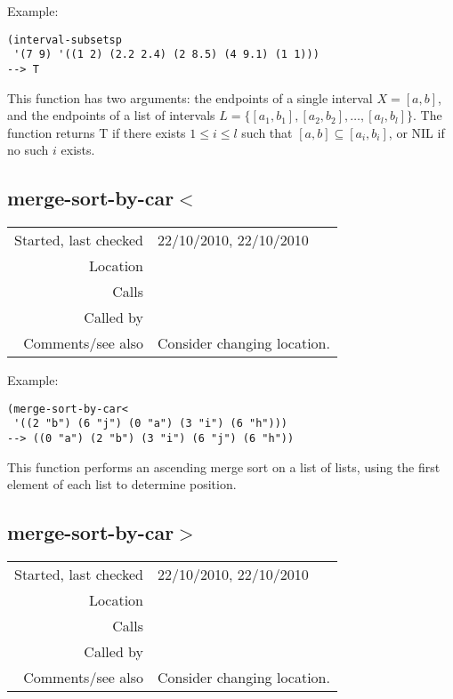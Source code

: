 \vspace{0.5cm}
\noindent Example:
\begin{verbatim}
(interval-subsetsp
 '(7 9) '((1 2) (2.2 2.4) (2 8.5) (4 9.1) (1 1)))
--> T
\end{verbatim}

\noindent This function has two arguments: the
endpoints of a single interval $X = [a, b]$, and the
endpoints of a list of intervals $L = \{[a_1, b_1],
[a_2, b_2],\ldots, [a_l, b_l]\}$. The function returns
T if there exists $1 \leq i \leq l$ such that $[a, b]
\subseteq [a_i, b_i]$, or NIL if no such $i$
exists.


\subsection*{merge-sort-by-car$<$}\label{fun:merge-sort-by-car<}

\vspace{0.3cm}
\begin{tabular}{r|p{8cm}}
Started, last checked & 22/10/2010, 22/10/2010 \\
Location & \nameref{sec:generating-with-patterns-preliminaries} \\
Calls & \nameref{fun:car<} \\
Called by & \\
Comments/see also & Consider changing location.
\end{tabular}

\vspace{0.5cm}
\noindent Example:
\begin{verbatim}
(merge-sort-by-car<
 '((2 "b") (6 "j") (0 "a") (3 "i") (6 "h")))
--> ((0 "a") (2 "b") (3 "i") (6 "j") (6 "h"))
\end{verbatim}

\noindent This function performs an ascending merge
sort on a list of lists, using the first element of
each list to determine position.


\subsection*{merge-sort-by-car$>$}\label{fun:merge-sort-by-car>}

\vspace{0.3cm}
\begin{tabular}{r|p{8cm}}
Started, last checked & 22/10/2010, 22/10/2010 \\
Location & \nameref{sec:generating-with-patterns-preliminaries} \\
Calls & \nameref{fun:car>} \\
Called by & \nameref{fun:indices-of-max-subset-score} \\
Comments/see also & Consider changing location.
\end{tabular}

